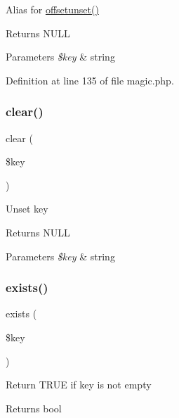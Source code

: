 Alias for \hyperlink{class_magic_a414cd1cb3c09fc06e5e83502f6309dde}{offsetunset()} \begin{DoxyReturn}{Returns}
N\+U\+LL 
\end{DoxyReturn}

\begin{DoxyParams}{Parameters}
{\em \$key} & string \\
\hline
\end{DoxyParams}


Definition at line 135 of file magic.\+php.

\hypertarget{class_magic_a10a949ef75de6c82c98ac555f371ba83}{}\label{class_magic_a10a949ef75de6c82c98ac555f371ba83} 
\subsubsection{\texorpdfstring{clear()}{clear()}}
{\footnotesize\ttfamily clear (\begin{DoxyParamCaption}\item[{}]{\$key }\end{DoxyParamCaption})\hspace{0.3cm}{\ttfamily [abstract]}}

Unset key \begin{DoxyReturn}{Returns}
N\+U\+LL 
\end{DoxyReturn}

\begin{DoxyParams}{Parameters}
{\em \$key} & string \\
\hline
\end{DoxyParams}
\hypertarget{class_magic_ace1ae5be37bf26c172cc7ea4e1a65e26}{}\label{class_magic_ace1ae5be37bf26c172cc7ea4e1a65e26} 
\subsubsection{\texorpdfstring{exists()}{exists()}}
{\footnotesize\ttfamily exists (\begin{DoxyParamCaption}\item[{}]{\$key }\end{DoxyParamCaption})\hspace{0.3cm}{\ttfamily [abstract]}}

Return T\+R\+UE if key is not empty \begin{DoxyReturn}{Returns}
bool 
\end{DoxyReturn}

